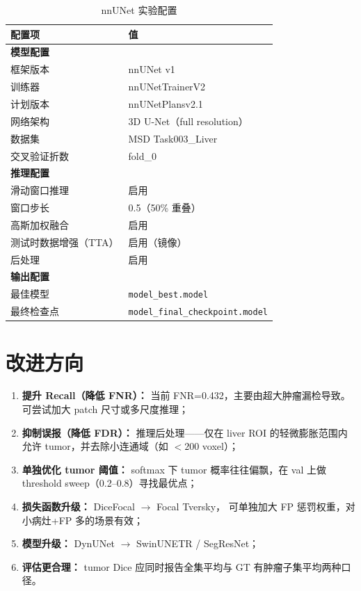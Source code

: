 \documentclass{article}
\begin{document}
	\begin{table}[H]
		\centering
		\caption{nnUNet 实验配置}
		\begin{tabular}{ll}
			\hline
			\textbf{配置项} & \textbf{值} \\
			\hline
			\multicolumn{2}{l}{\textbf{模型配置}} \\
			框架版本        & nnUNet v1 \\
			训练器          & nnUNetTrainerV2 \\
			计划版本        & nnUNetPlansv2.1 \\
			网络架构        & 3D U-Net（full resolution） \\
			数据集          & MSD Task003\_Liver \\
			交叉验证折数    & fold\_0 \\
			\hline
			\multicolumn{2}{l}{\textbf{推理配置}} \\
			滑动窗口推理    & 启用 \\
			窗口步长        & 0.5（50\% 重叠） \\
			高斯加权融合    & 启用 \\
			测试时数据增强（TTA） & 启用（镜像） \\
			后处理          & 启用 \\
			\hline
			\multicolumn{2}{l}{\textbf{输出配置}} \\
			最佳模型        & \texttt{model\_best.model} \\
			最终检查点      & \texttt{model\_final\_checkpoint.model} \\
			\hline
		\end{tabular}
	\end{table}
	
	\section{改进方向}
	
	\begin{enumerate}
		\item \textbf{提升 Recall（降低 FNR）：} 当前 FNR=0.432，主要由超大肿瘤漏检导致。
		可尝试加大 patch 尺寸或多尺度推理；
		
		\item \textbf{抑制误报（降低 FDR）：} 推理后处理——仅在 liver ROI 的轻微膨胀范围内允许
		tumor，并去除小连通域（如 $<200$ voxel）；
		
		\item \textbf{单独优化 tumor 阈值：} softmax 下 tumor 概率往往偏飘，在 val 上做
		threshold sweep（0.2–0.8）寻找最优点；
		
		\item \textbf{损失函数升级：} DiceFocal $\rightarrow$ Focal Tversky，
		可单独加大 FP 惩罚权重，对小病灶+FP 多的场景有效；
		
		\item \textbf{模型升级：} DynUNet $\rightarrow$ SwinUNETR / SegResNet；
		
		\item \textbf{评估更合理：} tumor Dice 应同时报告全集平均与 GT 有肿瘤子集平均两种口径。
	\end{enumerate}
	
\end{document}
